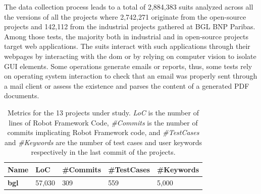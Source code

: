 The data collection process leads to a total of 2,884,383 \gls{suit}s analyzed across all the versions of all the projects where 2,742,271 originate from the open-source projects and 142,112 from the industrial projects gathered at BGL BNP Paribas. Among those tests, the majority both in industrial and in open-source projects target web applications. The \gls{suit}s interact with such applications through their webpages by interacting with the \gls{dom} or by relying on computer vision to isolate GUI elements. Some operations generate emails or reports, thus, some tests rely on operating system interaction to check that an email was properly sent through a mail client or assess the existence and parses the content of a generated PDF documents.

\begin{table}
\centering

\caption{Metrics for the 13 projects under study. \emph{LoC} is the number of lines of Robot Framework Code, \emph{\#Commits} is the number of commits implicating Robot Framework code, and \emph{\#TestCases} and \emph{\#Keywords} are the number of test cases and user keywords respectively in the last commit of the projects.}
\label{tab:projects}

\begin{tabular}{>{\raggedright}p{0.9in}>{\raggedleft}p{0.7in}>{\raggedleft}p{0.7in}>{\raggedleft}p{0.7in}>{\raggedleft}p{0.7in}}

\toprule
\scriptsize{\textbf{Name}} & \scriptsize{\textbf{LoC}} & \scriptsize{\textbf{\#Commits}} & \scriptsize{\textbf{\#TestCases}} & \scriptsize{\textbf{\#Keywords}} \tabularnewline
\toprule

\scriptsize{\textbf{bgl}} & \scriptsize{57,030} & \scriptsize{309} & \scriptsize{559} & \scriptsize{5,000} \tabularnewline

\midrule


\end{tabular}
\end{table}
